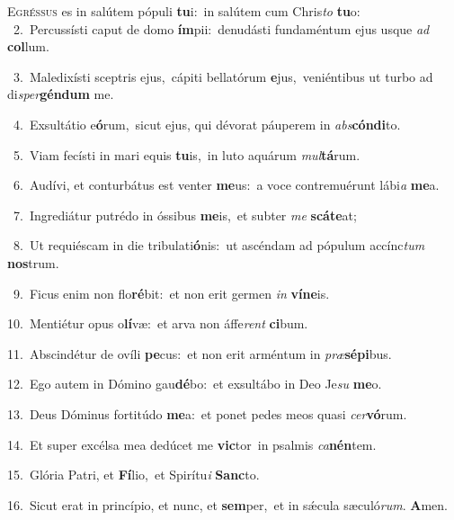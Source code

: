 \lettrine{\initial\textcolor{\initialcolor}{E}}{gréssus} es in salútem pópuli \textbf{tu}\-i:~\star in salútem cum Chris\textit{to} \textbf{tu}\-o:\\
{\numbfont\textcolor{\numbcolor}{~2.}}~Percussísti caput de domo \textbf{ím}\-pii:~\star denudásti fundaméntum ejus usque \textit{ad} \textbf{col}\-lum.\par
{\numbfont\textcolor{\numbcolor}{~3.}}~Maledixísti sceptris ejus,~\dagger cápiti bellatórum \textbf{e}\-jus,~\star veniéntibus ut turbo ad di\-\textit{sper}\-\textbf{gén}\textbf{dum} me.\par
{\numbfont\textcolor{\numbcolor}{~4.}}~Exsultátio e\-\textbf{ó}\-rum,~\star sicut ejus, qui dévorat páuperem in \textit{abs}\-\textbf{cón}\textbf{di}to.\par
{\numbfont\textcolor{\numbcolor}{~5.}}~Viam fecísti in mari equis \textbf{tu}\-is,~\star in luto aquárum \textit{mul}\-\textbf{tá}rum.\par
{\numbfont\textcolor{\numbcolor}{~6.}}~Audívi, et conturbátus est venter \textbf{me}\-us:~\star a voce contremuérunt lábi\textit{a} \textbf{me}\-a.\par
{\numbfont\textcolor{\numbcolor}{~7.}}~Ingrediátur putrédo in óssibus \textbf{me}\-is,~\star et subter \textit{me} \textbf{scá}\-\textbf{te}at;\par
{\numbfont\textcolor{\numbcolor}{~8.}}~Ut requiéscam in die tribulati\-\textbf{ó}\-nis:~\star ut ascéndam ad pópulum accínc\textit{tum} \textbf{nos}\-trum.\par
{\numbfont\textcolor{\numbcolor}{~9.}}~Ficus enim non flo\-\textbf{ré}\-bit:~\star et non erit germen \textit{in} \textbf{ví}\-\textbf{ne}is.\par
{\numbfont\textcolor{\numbcolor}{10.}}~Mentiétur opus o\-\textbf{lí}\-væ:~\star et arva non áffe\textit{rent} \textbf{ci}\-bum.\par
{\numbfont\textcolor{\numbcolor}{11.}}~Abscindétur de ovíli \textbf{pe}\-cus:~\star et non erit arméntum in \textit{præ}\-\textbf{sé}\textbf{pi}bus.\par
{\numbfont\textcolor{\numbcolor}{12.}}~Ego autem in Dómino gau\-\textbf{dé}\-bo:~\star et exsultábo in Deo Je\textit{su} \textbf{me}\-o.\par
{\numbfont\textcolor{\numbcolor}{13.}}~Deus Dóminus fortitúdo \textbf{me}\-a:~\star et ponet pedes meos quasi \textit{cer}\-\textbf{vó}rum.\par
{\numbfont\textcolor{\numbcolor}{14.}}~Et super excélsa mea dedúcet me \textbf{vic}\-tor~\star in psalmis \textit{ca}\-\textbf{nén}tem.\par
{\numbfont\textcolor{\numbcolor}{15.}}~Glória Patri, et \textbf{Fí}\-lio,~\star et Spirítu\textit{i} \textbf{Sanc}\-to.\par
{\numbfont\textcolor{\numbcolor}{16.}}~Sicut erat in princípio, et nunc, et \textbf{sem}\-per,~\star et in sǽcula sæculó\-\textit{rum}\-. \textbf{A}\-men.\par
